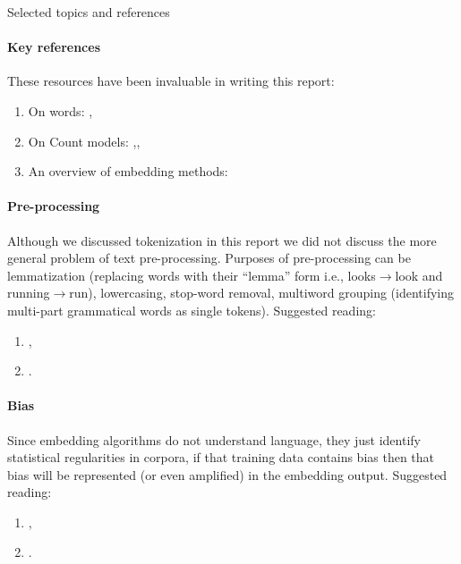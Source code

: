 \documentclass{ucetd}
\begin{document}
\begin{infobox}{Selected topics and references}{\small
  \paragraph{Key references} These resources have been invaluable in writing this report:\hspace{1.4em}
  \begin{enumerate}
    \item On words: \emph{} \parencite{halliday-2004-lexicology, dixon02-word},\vspace{-0.5em}
    \item On Count models: \emph{} \parencite{turney10-from-frequen-to-meanin, sahlgreen-2006-the-word-space-model},\vspace{-0.5em}, 
    \item An overview of embedding methods: \emph{} \parencite{wang-2019-evaluating, almeida19-word-embed}
    \end{enumerate}
  \paragraph{Pre-processing}
  Although we discussed tokenization in this report we did not discuss the more general problem of text pre-processing. Purposes of pre-processing can be lemmatization (replacing words with their ``lemma'' form i.e., looks$\rightarrow$look and running$\rightarrow$run), lowercasing, stop-word removal, multiword grouping (identifying multi-part grammatical words as single tokens). Suggested reading:
  \begin{enumerate}
    \item \emph{} \parencite{uysal-2014-the-impact-of-preprocessing},\vspace{-0.5em}
    \item \emph{} \parencite{camacho-collados17-role-text-prepr-neural-networ-archit}.
  \end{enumerate}
  \paragraph{Bias}\label{para:bias}
  Since embedding algorithms do not understand language, they just identify statistical regularities in corpora, if that training data contains bias then that bias will be represented (or even amplified) in the embedding output. Suggested reading:
  \begin{enumerate}
    \item \emph{} \parencite{caliskan-2017-semantics-derived},\vspace{-0.5em}
    \item \emph{} \parencite{bolukbasi16-man-is-to-comput-progr}.
  \end{enumerate}
}\end{infobox}
\end{document}
